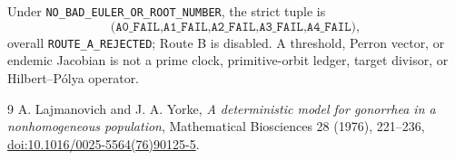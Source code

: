\documentclass[10pt]{article}
\begin{document}
Under \texttt{NO\_BAD\_EULER\_OR\_ROOT\_NUMBER}, the strict tuple is
\[
\texttt{(A0\_FAIL,A1\_FAIL,A2\_FAIL,A3\_FAIL,A4\_FAIL)},
\]
overall \texttt{ROUTE\_A\_REJECTED}; Route B is disabled.  A threshold,
Perron vector, or endemic Jacobian is not a prime clock, primitive-orbit
ledger, target divisor, or Hilbert--P\'olya operator.
\fi

\begin{thebibliography}{9}
 A. Lajmanovich and J. A. Yorke,
\emph{A deterministic model for gonorrhea in a nonhomogeneous population},
Mathematical Biosciences 28 (1976), 221--236,
\href{https://doi.org/10.1016/0025-5564(76)90125-5}{doi:10.1016/0025-5564(76)90125-5}.
\end{thebibliography}
\end{document}
